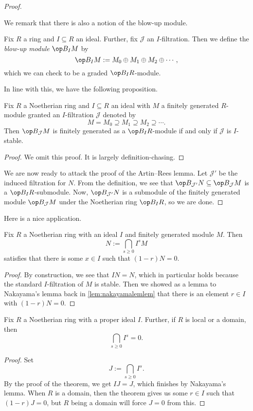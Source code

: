 \begin{proof}
\begin{ex}
\begin{itemize}
		\end{itemize}
	\end{ex}
	We remark that there is also a notion of the blow-up module.
	\begin{definition}
		Fix $R$ a ring and $I\subseteq R$ an ideal. Further, fix $\mathcal J$ an $I$-filtration. Then we define the \textit{blow-up module} $\op B_IM$ by
		\[\op B_IM:=M_0\oplus M_1\oplus M_2\oplus\cdots,\]
		which we can check to be a graded $\op B_IR$-module.
	\end{definition}
	In line with this, we have the following proposition.
	\begin{proposition}
		Fix $R$ a Noetherian ring and $I\subseteq R$ an ideal with $M$ a finitely generated $R$-module granted an $I$-filtration $\mathcal J$ denoted by
		\[M=M_0\supseteq M_1\supseteq M_2\supseteq\cdots.\]
		Then $\op B_\mathcal JM$ is finitely generated as a $\op B_IR$-module if and only if $\mathcal J$ is $I$-stable.
	\end{proposition}
	\begin{proof}
		We omit this proof. It is largely definition-chasing.
	\end{proof}
	We are now ready to attack the proof of the Artin--Rees lemma. Let $\mathcal J'$ be the induced filtration for $N$. From the definition, we see that $\op B_{\mathcal J'}N\subseteq\op B_\mathcal JM$ is a $\op B_IR$-submodule. Now, $\op B_{\mathcal J'}N$ is a submodule of the finitely generated module $\op B_\mathcal JM$ under the Noetherian ring $\op B_IR$, so we are done.
\end{proof}
Here is a nice application.
\begin{theorem}
	Fix $R$ a Noetherian ring with an ideal $I$ and finitely generated module $M$. Then
	\[N:=\bigcap_{s\ge0}I^sM\]
	satisfies that there is some $x\in I$ such that $(1-r)N=0$.
\end{theorem}
\begin{proof}
	By construction, we see that $IN=N$, which in particular holds because the standard $I$-filtration of $M$ is stable. Then we showed as a lemma to Nakayama's lemma back in \autoref{lem:nakayamalemlem} that there is an element $r\in I$ with $(1-r)N=0$.
\end{proof}
\begin{corollary}
	Fix $R$ a Noetherian ring with a proper ideal $I$. Further, if $R$ is local or a domain, then
	\[\bigcap_{s\ge0}I^s=0.\]
\end{corollary}
\begin{proof}
	Set
	\[J:=\bigcap_{s\ge0}I^s.\]
	By the proof of the theorem, we get $IJ=J$, which finishes by Nakayama's lemma. When $R$ is a domain, then the theorem gives us some $r\in I$ such that $(1-r)J=0$, but $R$ being a domain will force $J=0$ from this.
\end{proof}
